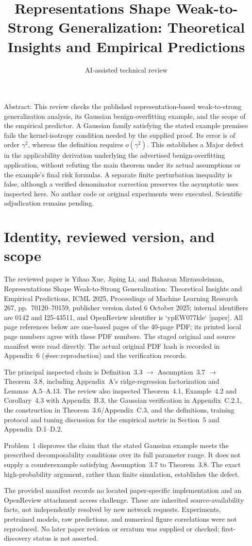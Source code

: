 \documentclass[10pt]{article}
\title{Representations Shape Weak-to-Strong Generalization: Theoretical Insights and Empirical Predictions}
\author{AI-assisted technical review}
\date{}
\begin{document}
\maketitle
Abstract: This review checks the published representation-based weak-to-strong generalization analysis, its Gaussian benign-overfitting example, and the scope of the empirical predictor. A Gaussian family satisfying the stated example premises fails the kernel-isotropy condition needed by the supplied proof. Its error is of order \(\gamma^2\), whereas the definition requires \(o(\gamma^2)\). This establishes a Major defect in the applicability derivation underlying the advertised benign-overfitting application, without refuting the main theorem under its actual assumptions or the example’s final risk formulas. A separate finite perturbation inequality is false, although a verified denominator correction preserves the asymptotic uses inspected here. No author code or original experiments were executed. Scientific adjudication remains pending.\par
\section*{Identity, reviewed version, and scope}
The reviewed paper is Yihao Xue, Jiping Li, and Baharan Mirzasoleiman, Representations Shape Weak-to-Strong Generalization: Theoretical Insights and Empirical Predictions, ICML 2025, Proceedings of Machine Learning Research 267, pp. 70120–70159, publisher version dated 6 October 2025; internal identifiers are 0142 and I25-43511, and OpenReview identifier is `ypEW077kle` [paper]. All page references below are one-based pages of the 40-page PDF; its printed local page numbers agree with these PDF numbers. The staged original and source manifest were read directly. The actual original PDF hash is recorded in Appendix 6 (\#sec:reproduction) and the verification records.\par
The principal inspected chain is Definition 3.3 \(\to\) Assumption 3.7 \(\to\) Theorem 3.8, including Appendix A’s ridge-regression factorization and Lemmas A.5–A.13. The review also inspected Theorem 4.1, Example 4.2 and Corollary 4.3 with Appendix B.3, the Gaussian verification in Appendix C.2.1, the construction in Theorem 3.6/Appendix C.3, and the definitions, training protocol and tuning discussion for the empirical metric in Section 5 and Appendix D.1–D.2.\par
Problem 1 disproves the claim that the stated Gaussian example meets the prescribed decomposability conditions over its full parameter range. It does not supply a counterexample satisfying Assumption 3.7 to Theorem 3.8. The exact high-probability argument, rather than finite simulation, establishes the defect.\par
The provided manifest records no located paper-specific implementation and an OpenReview attachment access challenge. These are inherited source-availability facts, not independently resolved by new network requests. Experiments, pretrained models, raw predictions, and numerical figure correlations were not reproduced. No later paper revision or erratum was supplied or checked; first-discovery status is not asserted.\par
\end{document}
